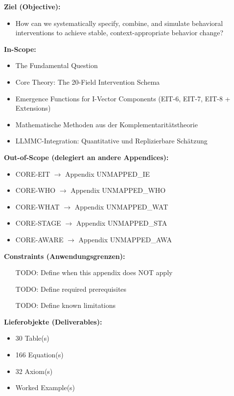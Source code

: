 \begin{tcolorbox}[
    colback=orange!5!white,
    colframe=orange!75!black,
    title={\textbf{Appendix Scope: Ziel / In-Scope / Out-of-Scope / Constraints}},
    fonttitle=\bfseries
]

\textbf{Ziel (Objective):}
\begin{itemize}[nosep]
    \item How can we systematically specify, combine, and simulate behavioral interventions to achieve stable, context-appropriate behavior change?
\end{itemize}

\textbf{In-Scope:}
\begin{itemize}[nosep]
    \item The Fundamental Question
    \item Core Theory: The 20-Field Intervention Schema
    \item Emergence Functions for I-Vector Components (EIT-6, EIT-7, EIT-8 + Extensions)
    \item Mathematische Methoden aus der Komplementaritätstheorie
    \item LLMMC-Integration: Quantitative und Replizierbare Schätzung
\end{itemize}

\textbf{Out-of-Scope (delegiert an andere Appendices):}
\begin{itemize}[nosep]
    \item CORE-EIT $\rightarrow$ Appendix UNMAPPED_IE
    \item CORE-WHO $\rightarrow$ Appendix UNMAPPED_WHO
    \item CORE-WHAT $\rightarrow$ Appendix UNMAPPED_WAT
    \item CORE-STAGE $\rightarrow$ Appendix UNMAPPED_STA
    \item CORE-AWARE $\rightarrow$ Appendix UNMAPPED_AWA
\end{itemize}

\textbf{Constraints (Anwendungsgrenzen):}
\begin{itemize}[nosep]
    \item [TODO: Define when this appendix does NOT apply]
    \item [TODO: Define required prerequisites]
    \item [TODO: Define known limitations]
\end{itemize}

\textbf{Lieferobjekte (Deliverables):}
\begin{itemize}[nosep]
    \item 30 Table(s)
    \item 166 Equation(s)
    \item 32 Axiom(s)
    \item Worked Example(s)
\end{itemize}

\end{tcolorbox}


